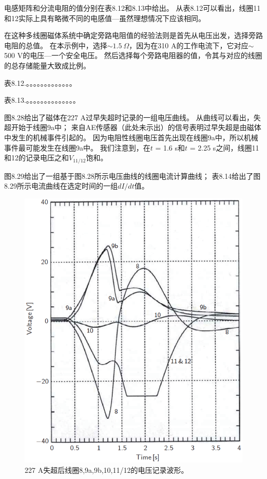电感矩阵和分流电阻的值分别在表8.12和8.13中给出。
从表8.12可以看出，线圈11和12实际上具有略微不同的电感值---虽然理想情况下应该相同。

在这种多线圈磁体系统中确定旁路电阻值的经验法则是首先从电压出发，选择旁路电阻的总值。
在本示例中，选择$\sim 1.5\ \Omega$，因为在310 A的工作电流下，它对应$\sim$500 V的电压---一个安全电压。
然后选择每个旁路电阻器的值，令其与对应的线圈的总存储能量大致成比例。

表8.12.。。。。。。。。。。。。。

表8.13.。。。。。。。。。。。。。。

图8.28给出了磁体在227 A过早失超时记录的一组电压曲线。
从曲线可以看出，失超开始于线圈9a中；
 来自AE传感器（此处未示出）的信号表明过早失超是由磁体中发生的机械事件引起的。
  因为电阻性线圈电压首先出现在线圈9a中，所以机械事件最可能发生在线圈9a中。
   我们注意到，在$t$ = 1.6 s和$t$ = 2.25 s之间，线圈11和12的记录电压之和$V_{11/12}$饱和。

图8.29给出了一组基于图8.28所示电压曲线的线圈电流计算曲线；
 表8.14给出了图8.29所示电流曲线在选定时间的一组$dI / dt$值。
 
\begin{figure}
	\centering
	\includegraphics[scale=0.4]{chpt8/figs/fig8.28.eps}
	\caption{227 A失超后线圈8,9a,9b,10,11/12的电压记录波形。}
\end{figure}


